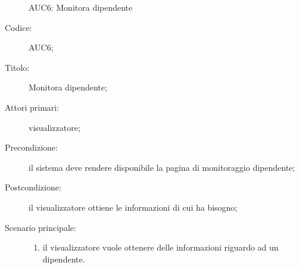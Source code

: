 \documentclass[../../../analisi-dei-requisiti.tex]{subfiles}
\begin{document}
\begin{figure}[H]
  \centering
  \caption{AUC6: Monitora dipendente}%
  \label{fig:AUC6}
\end{figure}

\begin{description}
  \item[Codice:] AUC6;
  \item[Titolo:] Monitora dipendente;
  \item[Attori primari:] visualizzatore;
  \item[Precondizione:]  il sistema deve rendere disponibile la pagina di monitoraggio dipendente;
  \item[Postcondizione:] il visualizzatore ottiene le informazioni di cui ha bisogno;
  \item[Scenario principale:]
  \begin{enumerate}
    \item il visualizzatore vuole ottenere delle informazioni riguardo ad un dipendente.
  \end{enumerate}
\end{description}
\end{document}

